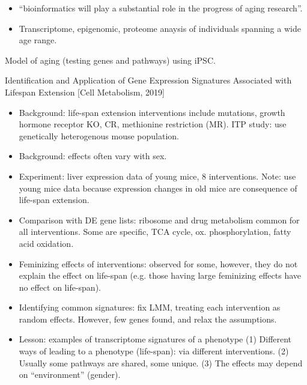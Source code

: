 \documentclass{report}
\begin{document}
\begin{itemize}
\begin{itemize}
		\item ``bioinformatics will play a substantial role in the progress of aging research''. 
		
		\item Transcriptome, epigenomic, proteome anaysis of individuals spanning a wide age range. 
	\end{itemize}
	Model of aging (testing genes and pathways) using iPSC. 
	
\end{itemize}

Identification and Application of Gene Expression Signatures Associated with Lifespan Extension [Cell Metabolism, 2019]
\begin{itemize}
	\item Background: life-span extension interventions include mutations, growth hormone receptor KO, CR, methionine restriction (MR). ITP study: use genetically heterogenous mouse population.
	
	\item Background: effects often vary with sex.
	
	\item Experiment: liver expression data of young mice, 8 interventions. Note: use young mice data because expression changes in old mice are consequence of life-span extension.
	
	\item Comparison with DE gene lists: ribosome and drug metabolism common for all interventions. Some are specific, TCA cycle, ox. phosphorylation, fatty acid oxidation.
	
	\item Feminizing effects of interventions: observed for some, however, they do not explain the effect on life-span (e.g. those having large feminizing effects have no effect on life-span).
	
	\item Identifying common signatures: fix LMM, treating each intervention as random effects. However, few genes found, and relax the assumptions.
	
	\item Lesson: examples of transcriptome signatures of a phenotype (1) Different ways of leading to a phenotype (life-span): via different interventions. (2) Usually some pathways are shared, some unique. (3) The effects may depend on “environment” (gender).
\end{itemize}
\end{document}
